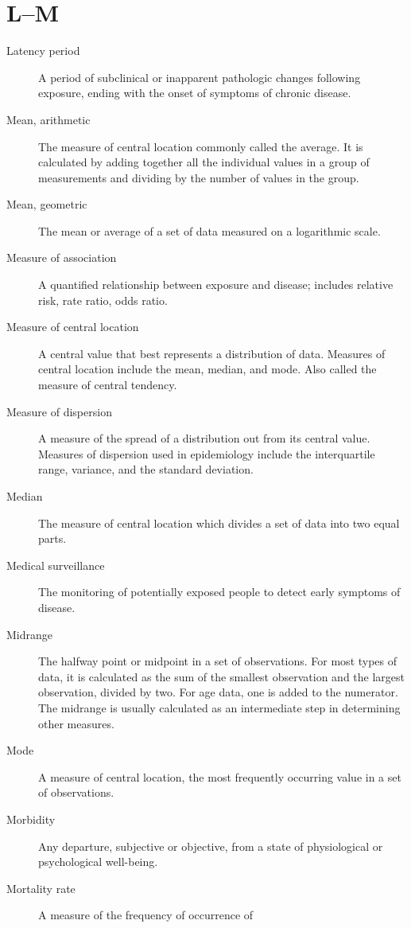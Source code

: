 \documentclass[11pt]{article}
\begin{document}
\section*{L--M}

\begin{description}
\item[Latency period] A period of subclinical or inapparent
pathologic changes following exposure, ending with the onset of
symptoms of chronic disease.
\item[Mean, arithmetic] The measure of central location commonly
called the average. It is calculated by adding together all the
individual values in a group of measurements and dividing by the
number of values in the group.
\item[Mean, geometric] The mean or average of a set of data
measured on a logarithmic scale.
\item[Measure of association] A quantified relationship between
exposure and disease; includes relative risk, rate ratio, odds
ratio.
\item[Measure of central location] A central value that best
represents a distribution of data. Measures of central location
include the mean, median, and mode. Also called the measure of
central tendency.
\item[Measure of dispersion] A measure of the spread of a
distribution out from its central value. Measures of dispersion
used in epidemiology include the interquartile range, variance,
and the standard deviation.
\item[Median] The measure of central location which divides a set
of data into two equal parts.
\item[Medical surveillance] The monitoring of potentially exposed
people to detect early symptoms of disease.
\item[Midrange] The halfway point or midpoint in a set of
observations. For most types of data, it is calculated as the sum
of the smallest observation and the largest observation, divided
by two. For age data, one is added to the numerator. The midrange
is usually calculated as an intermediate step in determining
other measures.
\item[Mode] A measure of central location, the most frequently
occurring value in a set of observations.
\item[Morbidity] Any departure, subjective or objective, from a
state of physiological or psychological well-being.
\item[Mortality rate] A measure of the frequency of occurrence of

\end{description}
\end{document}

